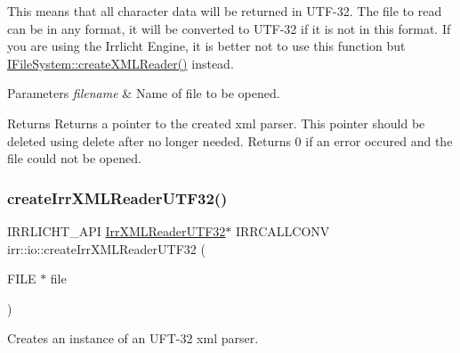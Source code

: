 This means that all character data will be returned in U\+T\+F-\/32. The file to read can be in any format, it will be converted to U\+T\+F-\/32 if it is not in this format. If you are using the Irrlicht Engine, it is better not to use this function but \hyperlink{classirr_1_1io_1_1IFileSystem_a167c9fa159d16ee5c56c074636b0865e}{I\+File\+System\+::create\+X\+M\+L\+Reader()} instead. 
\begin{DoxyParams}{Parameters}
{\em filename} & Name of file to be opened. \\
\hline
\end{DoxyParams}
\begin{DoxyReturn}{Returns}
Returns a pointer to the created xml parser. This pointer should be deleted using \textquotesingle{}delete\textquotesingle{} after no longer needed. Returns 0 if an error occured and the file could not be opened. 
\end{DoxyReturn}
\mbox{\label{namespaceirr_1_1io_a4ea88dd2598272cff85357611a5e5938}} 
\subsubsection{\texorpdfstring{create\+Irr\+X\+M\+L\+Reader\+U\+T\+F32()}{createIrrXMLReaderUTF32()}\hspace{0.1cm}{\footnotesize\ttfamily [2/3]}}
{\footnotesize\ttfamily I\+R\+R\+L\+I\+C\+H\+T\+\_\+\+A\+PI \hyperlink{namespaceirr_1_1io_a70f411ff403636fb5c4e9becb090d5ec}{Irr\+X\+M\+L\+Reader\+U\+T\+F32}$\ast$ I\+R\+R\+C\+A\+L\+L\+C\+O\+NV irr\+::io\+::create\+Irr\+X\+M\+L\+Reader\+U\+T\+F32 (\begin{DoxyParamCaption}\item[{F\+I\+LE $\ast$}]{file }\end{DoxyParamCaption})}



Creates an instance of an U\+F\+T-\/32 xml parser. 

